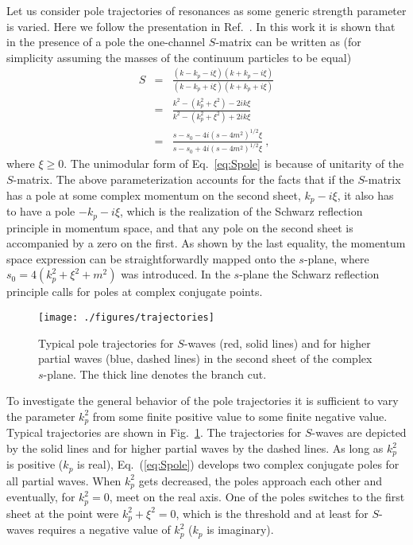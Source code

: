 Let us consider pole trajectories of resonances as some generic strength
parameter is varied.
Here we follow the presentation in Ref.~\cite{Hanhart:2014ssa}. In this work it
is shown that in the presence of a pole the one-channel $S$-matrix can be
written as (for simplicity assuming the masses of the continuum particles to be
equal) \begin{eqnarray} \nonumber S &=&
\frac{(k-k_p-i\xi)(k+k_p-i\xi)}{(k-k_p+i\xi)(k+k_p+i\xi)} \\
&=&  \nonumber \frac{k^2-(k_p^2+\xi^2)-2ik\xi}{k^2-(k_p^2+\xi^2)+2ik\xi} \\
&=&\frac{s-s_0-4i(s-4m^2)^{1/2}\xi}{s-s_0+4i(s-4m^2)^{1/2}\xi} \ ,
\label{eq:Spole}
\end{eqnarray}
where $\xi\geq0$. {The unimodular form of Eq.~\eqref{eq:Spole} is because
of unitarity of the $S$-matrix.} The above parameterization accounts for the
facts that if the $S$-matrix has a pole at some complex momentum on the second
sheet, $k_p-i\xi$, it also has to have a pole $-k_p-i\xi$, which is the
realization of the Schwarz reflection principle in momentum space, and that any
pole on the second sheet is accompanied by a zero on the first.
As shown by the last equality, the momentum space expression can be
straightforwardly mapped onto the $s$-plane, where $s_0=4(k_p^2 + \xi^2 + m^2)$
was introduced. In the $s$-plane the Schwarz reflection principle calls for
poles at complex conjugate points.

\begin{figure} 
 \centering
   \texttt{[image: ./figures/trajectories]}
   \caption{Typical pole trajectories for $S$-waves  (red, solid lines) and for 
higher partial waves (blue, dashed lines)
   in the second sheet of the complex $s$-plane. The thick line denotes the 
branch cut.}\label{fig:poletraj}
\end{figure}
To investigate the general behavior of the pole trajectories it is sufficient 
to vary the parameter $k_p^2$ from some finite positive
value to some finite negative value. Typical trajectories are shown in 
Fig.~\ref{fig:poletraj}.  The trajectories for $S$-waves
are depicted by the solid lines and for higher partial waves by the dashed 
lines. As long as $k_p^2$ is positive ($k_p$ is real),
Eq.~(\ref{eq:Spole}) develops two complex conjugate poles for all partial waves. 
When $k_p^2$ gets decreased, the poles approach each
other and eventually, for $k_p^2=0$, meet on the real axis. One of the poles 
switches to the first sheet at the
point were $k_p^2+\xi^2=0$, which is the threshold and at least for $S$-waves 
requires a negative value of $k_p^2$ ($k_p$ is imaginary).


